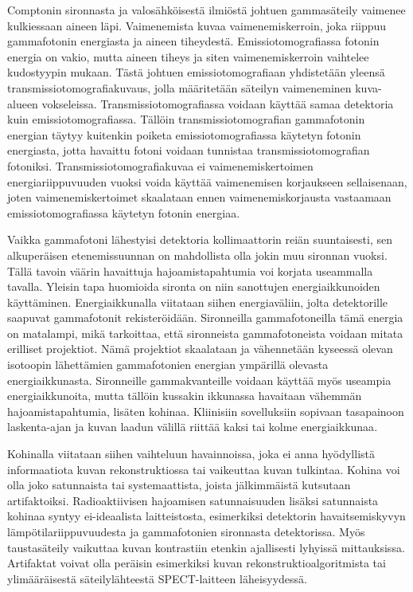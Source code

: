 Comptonin sironnasta ja valosähköisestä ilmiöstä johtuen gammasäteily vaimenee kulkiessaan aineen läpi. Vaimenemista kuvaa vaimenemiskerroin, joka riippuu gammafotonin energiasta ja aineen tiheydestä. Emissiotomografiassa fotonin energia on vakio, mutta aineen tiheys ja siten vaimenemiskerroin vaihtelee kudostyypin mukaan\cite{king_attenuation_2004, cherry_single_2012}. Tästä johtuen emissiotomografiaan yhdistetään yleensä transmissiotomografiakuvaus, jolla määritetään säteilyn vaimeneminen kuva-alueen vokseleissa\cite{king_attenuation_2004, cherry_single_2012, wettenhovi_omegaopen-source_2021}. Transmissiotomografiassa voidaan käyttää samaa detektoria kuin emissiotomografiassa. Tällöin transmissiotomografian gammafotonin energian täytyy kuitenkin poiketa emissiotomografiassa käytetyn fotonin energiasta, jotta havaittu fotoni voidaan tunnistaa transmissiotomografian fotoniksi. Transmissiotomografiakuvaa ei vaimenemiskertoimen energiariippuvuuden vuoksi voida käyttää vaimenemisen korjaukseen sellaisenaan, joten vaimenemiskertoimet skaalataan ennen vaimenemiskorjausta vastaamaan emissiotomografiassa käytetyn fotonin energiaa\cite{cherry_single_2012, king_attenuation_2004, wettenhovi_omegaopen-source_2021}.

Vaikka gammafotoni lähestyisi detektoria kollimaattorin reiän suuntaisesti, sen alkuperäisen etenemissuunnan on mahdollista olla jokin muu sironnan vuoksi. Tällä tavoin väärin havaittuja hajoamistapahtumia voi korjata useammalla tavalla. Yleisin tapa huomioida sironta on niin sanottujen energiaikkunoiden käyttäminen. Energiaikkunalla viitataan siihen energiaväliin, jolta detektorille saapuvat gammafotonit rekisteröidään. Sironneilla gammafotoneilla tämä energia on matalampi, mikä tarkoittaa, että sironneista gammafotoneista voidaan mitata erilliset projektiot. Nämä projektiot skaalataan ja vähennetään kyseessä olevan isotoopin lähettämien gammafotonien energian ympärillä olevasta energiaikkunasta. Sironneille gammakvanteille voidaan käyttää myös useampia energiaikkunoita, mutta tällöin kussakin ikkunassa havaitaan vähemmän hajoamistapahtumia, lisäten kohinaa.\cite{cherry_single_2012, king_attenuation_2004} Kliinisiin sovelluksiin sopivaan tasapainoon laskenta-ajan ja kuvan laadun välillä riittää kaksi tai kolme energiaikkunaa\cite{king_attenuation_2004, cherry_single_2012}. 

Kohinalla viitataan siihen vaihteluun havainnoissa, joka ei anna hyödyllistä informaatiota kuvan rekonstruktiossa tai vaikeuttaa kuvan tulkintaa. Kohina voi olla joko satunnaista tai systemaattista, joista jälkimmäistä kutsutaan artifaktoiksi. Radioaktiivisen hajoamisen satunnaisuuden lisäksi satunnaista kohinaa syntyy ei-ideaalista laitteistosta, esimerkiksi detektorin havaitsemiskyvyn lämpötilariippuvuudesta ja gammafotonien sironnasta detektorissa. Myös taustasäteily vaikuttaa kuvan kontrastiin etenkin ajallisesti lyhyissä mittauksissa.\cite{cherry_single_2012, king_attenuation_2004} Artifaktat voivat olla peräisin esimerkiksi kuvan rekonstruktioalgoritmista tai ylimääräisestä säteilylähteestä SPECT-laitteen läheisyydessä.


